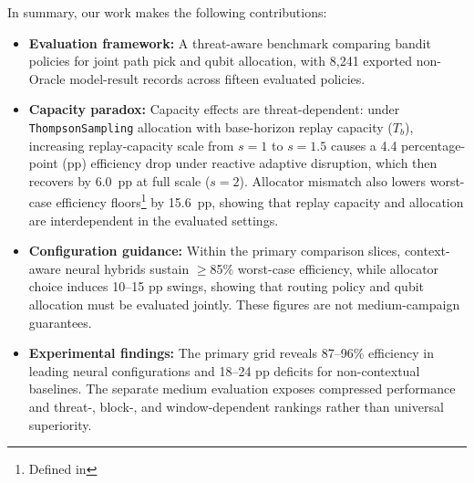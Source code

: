 \documentclass[10pt,journal]{IEEEtran}
\newcommand{\descStep}[2]{\noindent\textbf{#1:} #2}
\newcommand{\devroop}[1]{\textcolor{magenta}{\textit{[Devroop: #1]}}}
\begin{document}
In summary, our work makes the following contributions:
\begin{itemize}
    \item \descStep{Evaluation framework}{A threat-aware benchmark comparing bandit policies for joint path pick and qubit allocation, with 8,241 exported non-Oracle model-result records across fifteen evaluated policies.}

    \item \descStep{Capacity paradox}{Capacity effects are
    threat-dependent: under \texttt{ThompsonSampling} allocation
    with base-horizon replay capacity ($T_b$), increasing replay-capacity scale from $s{=}1$ to $s{=}1.5$ causes a
    4.4 percentage-point (pp) efficiency drop under reactive
    adaptive disruption, which then recovers by 6.0~pp at full
    scale ($s{=}2$). Allocator mismatch also lowers worst-case
    efficiency floors\footnote{Defined in \Cref{tab:notation_metrics}} by 15.6~pp,
    showing that replay capacity and allocation are interdependent in the evaluated settings.}

    \item \descStep{Configuration guidance}
    {Within the primary comparison slices, context-aware neural hybrids sustain $\geq$85\% worst-case efficiency, while allocator choice induces 10--15 pp swings, showing that routing policy and qubit allocation must be evaluated jointly. These figures are not medium-campaign guarantees.}

    \item \descStep{Experimental findings} 
    {The primary grid reveals 87--96\% efficiency in leading neural configurations and 18--24 pp deficits for non-contextual baselines. The separate medium evaluation exposes compressed performance and threat-, block-, and window-dependent rankings rather than universal superiority.}
\end{itemize}
\end{document}
